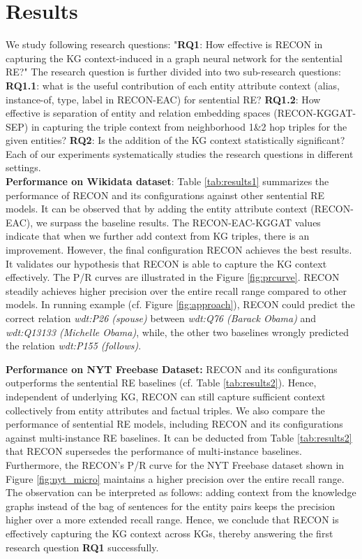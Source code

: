 \documentclass[sigconf]{acmart}
\begin{document}
\section{Results} \label{sec:evaluation}
We study following research questions: "\textbf{RQ1}: How effective is RECON in capturing the KG context-induced in a graph neural network for the sentential RE?" The research question is further divided into two sub-research questions: \textbf{RQ1.1}: what is the useful contribution of each entity attribute context (alias, instance-of, type, label in RECON-EAC) for sentential RE? \textbf{RQ1.2}: How effective is separation of entity and relation embedding spaces (RECON-KGGAT-SEP) in capturing the triple context from neighborhood 1\&2 hop triples for the given entities? \textbf{RQ2}: Is the addition of the KG context statistically significant? Each of our experiments systematically studies the research questions in different settings.\\
\textbf{Performance on Wikidata dataset}: Table \ref{tab:results1} summarizes the performance of RECON and its configurations against other sentential RE models. It can be observed that by adding the entity attribute context (RECON-EAC), we surpass the baseline results. The RECON-EAC-KGGAT values indicate that when we further add context from KG triples, there is an improvement. 
However, the final configuration RECON achieves the best results. It validates our hypothesis that RECON is able to capture the KG context effectively. The P/R curves are illustrated in the Figure \ref{fig:prcurve}.
RECON steadily achieves higher precision over the entire recall range compared to other models.
In running example (cf. Figure \ref{fig:approach}), RECON could predict the correct relation \textit{wdt:P26 (spouse)} between \textit{wdt:Q76 (Barack Obama)} and \textit{wdt:Q13133 (Michelle Obama)}, while, the other two baselines wrongly predicted the relation \textit{wdt:P155 (follows)}. 


\textbf{Performance on NYT Freebase Dataset:} RECON and its configurations outperforms the sentential RE baselines (cf. Table \ref{tab:results2}). Hence, independent of underlying KG, RECON can still capture sufficient context collectively from entity attributes and factual triples. We also compare the performance of sentential RE models, including RECON and its configurations against multi-instance RE baselines. It can be deducted from Table \ref{tab:results2} that RECON supersedes the performance of multi-instance baselines. Furthermore, the RECON's P/R curve for the NYT Freebase dataset shown in Figure \ref{fig:nyt_micro} maintains a higher precision over the entire recall range. The observation can be interpreted as follows: adding context from the knowledge graphs instead of the bag of sentences for the entity pairs keeps the precision higher over a more extended recall range. Hence, we conclude that RECON is effectively capturing the KG context across KGs, thereby answering the first research question \textbf{RQ1} successfully.
\end{document}
